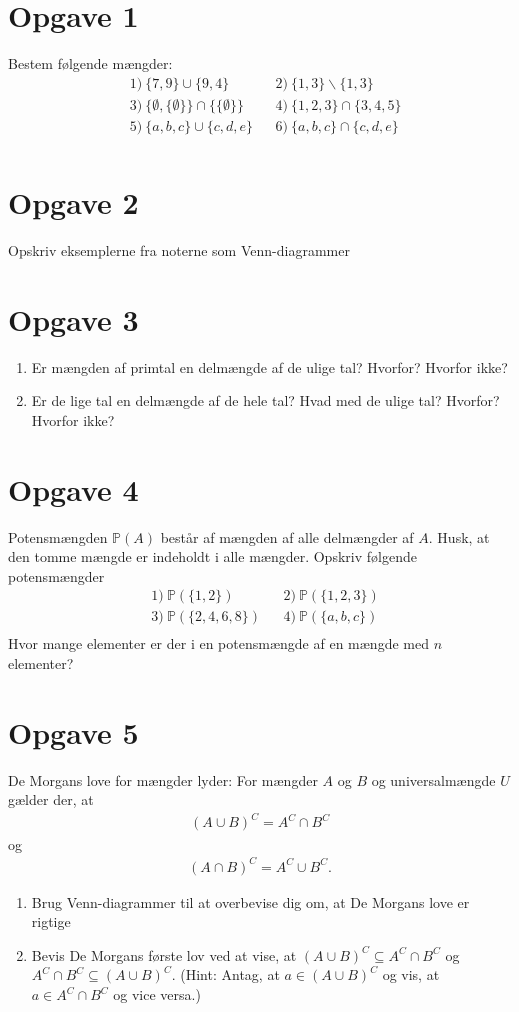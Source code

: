 \section*{Opgave 1}
Bestem følgende mængder:
\begin{align*}
&1) \ \{7,9\} \cup \{9,4\}  &&2) \ \{1,3\} \backslash \{1,3\}    \\
&3) \ \{\emptyset, \{\emptyset\}\} \cap \{\{\emptyset\}\}  &&4) \ \{1,2,3\} \cap \{3,4,5\}  \\
&5) \ \{a,b,c\} \cup \{c,d,e\}  &&6) \ \{a,b,c\} \cap \{c,d,e\}   \\
\end{align*}
\section*{Opgave 2}
Opskriv eksemplerne fra noterne som Venn-diagrammer
\section*{Opgave 3}
\begin{enumerate}[label=\roman*)]
\item Er mængden af primtal en delmængde af de ulige tal? Hvorfor? Hvorfor ikke?
\item Er de lige tal en delmængde af de hele tal? Hvad med de ulige tal? Hvorfor? Hvorfor ikke?
\end{enumerate}
\section*{Opgave 4}
Potensmængden $\mathbb{P}(A)$ består af mængden af alle delmængder af $A$. Husk, at den tomme mængde er indeholdt i alle mængder. Opskriv følgende potensmængder
\begin{align*}
&1) \ \mathbb{P}(\{1,2\})    &&2) \  \mathbb{P}(\{1,2,3\})  \\
&3) \ \mathbb{P}(\{2,4,6,8\})   &&4) \ \mathbb{P}(\{a,b,c\}) \\    
\end{align*}
Hvor mange elementer er der i en potensmængde af en mængde med $n$ elementer?
\section*{Opgave 5}
De Morgans love for mængder lyder: For mængder $A$ og $B$ og universalmængde $U$ gælder der, at
\begin{align*}
(A\cup B)^C = A^C \cap B^C
\end{align*} og
\begin{align*}
(A \cap B)^C = A^C \cup B^C.
\end{align*}
\begin{enumerate}[label=\roman*)]
\item Brug Venn-diagrammer til at overbevise dig om, at De Morgans love er rigtige
\item Bevis De Morgans første lov ved at vise, at $(A\cup B)^C \subseteq A^C \cap B^C$ og $ A^C \cap B^C \subseteq (A\cup B)^C$. (Hint: Antag, at $a \in (A\cup B)^C$ og vis, at $a \in A^C \cap B^C $ og vice versa.)
\end{enumerate}